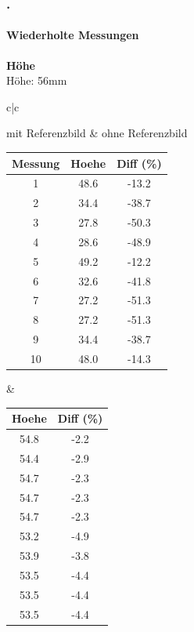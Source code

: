 \documentclass[xcolor=dvipsnames]{beamer}
\def\frametitlesec{\frametitle{\arabic{section}.\hspace{0.5ex}\insertsection}}
\def\framesubtitles#1{\framesubtitle{\hspace{3.5ex}#1}}
\begin{document}
\begin{frame}
	\frametitlesec
	\framesubtitles{Wiederholte Messungen}
		\textbf{Höhe}\\
		
		Höhe: 56mm
		
		\begin{tabular}{c|c}
		
		mit Referenzbild & ohne Referenzbild\\
		
		\begin{tabular}{c|c|c}
			Messung & Hoehe & Diff (\%) \\ \hline
1 & 48.6 & -13.2 \\
2 & 34.4 & -38.7 \\
3 & 27.8 & -50.3 \\
4 & 28.6 & -48.9 \\
5 & 49.2 & -12.2 \\
6 & 32.6 & -41.8 \\
7 & 27.2 & -51.3 \\
8 & 27.2 & -51.3 \\
9 & 34.4 & -38.7 \\
10 & 48.0 & -14.3\\

		\end{tabular} &
		
		
		\begin{tabular}{c|c}
			Hoehe & Diff (\%) \\ \hline
 54.8 &  -2.2 \\
 54.4 &  -2.9 \\
 54.7 &  -2.3 \\
 54.7 &  -2.3 \\
 54.7 &  -2.3 \\
 53.2 &  -4.9 \\
 53.9 &  -3.8 \\
 53.5 &  -4.4 \\
 53.5 &  -4.4 \\
 53.5 & -4.4 \\


		\end{tabular}
		
		\end{tabular}
\end{frame}
\end{document}
